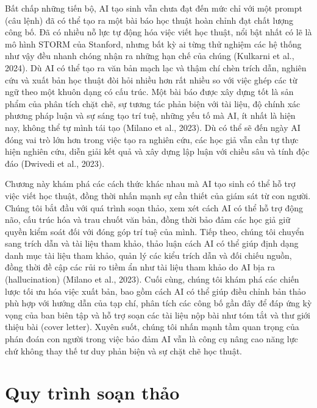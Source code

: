 Bất chấp những tiến bộ, AI tạo sinh vẫn chưa đạt đến mức chỉ với một prompt (câu lệnh) đã có thể tạo ra một bài báo học thuật hoàn chỉnh đạt chất lượng công bố. Đã có nhiều nỗ lực tự động hóa việc viết học thuật, nổi bật nhất có lẽ là mô hình STORM của Stanford, nhưng bất kỳ ai từng thử nghiệm các hệ thống như vậy đều nhanh chóng nhận ra những hạn chế của chúng (Kulkarni et al., 2024). Dù AI có thể tạo ra văn bản mạch lạc và thậm chí chèn trích dẫn, nghiên cứu và xuất bản học thuật đòi hỏi nhiều hơn rất nhiều so với việc ghép các từ ngữ theo một khuôn dạng có cấu trúc. Một bài báo được xây dựng tốt là sản phẩm của phân tích chặt chẽ, sự tương tác phản biện với tài liệu, độ chính xác phương pháp luận và sự sáng tạo trí tuệ, những yếu tố mà AI, ít nhất là hiện nay, không thể tự mình tái tạo (Milano et al., 2023). Dù có thể sẽ đến ngày AI đóng vai trò lớn hơn trong việc tạo ra nghiên cứu, các học giả vẫn cần tự thực hiện nghiên cứu, diễn giải kết quả và xây dựng lập luận với chiều sâu và tính độc đáo (Dwivedi et al., 2023).

Chương này khám phá các cách thức khác nhau mà AI tạo sinh có thể hỗ trợ việc viết học thuật, đồng thời nhấn mạnh sự cần thiết của giám sát từ con người. Chúng tôi bắt đầu với quá trình soạn thảo, xem xét cách AI có thể hỗ trợ động não, cấu trúc hóa và trau chuốt văn bản, đồng thời bảo đảm các học giả giữ quyền kiểm soát đối với đóng góp trí tuệ của mình. Tiếp theo, chúng tôi chuyển sang trích dẫn và tài liệu tham khảo, thảo luận cách AI có thể giúp định dạng danh mục tài liệu tham khảo, quản lý các kiểu trích dẫn và đối chiếu nguồn, đồng thời đề cập các rủi ro tiềm ẩn như tài liệu tham khảo do AI bịa ra (hallucination) (Milano et al., 2023). Cuối cùng, chúng tôi khám phá các chiến lược tối ưu hóa việc xuất bản, bao gồm cách AI có thể giúp điều chỉnh bản thảo phù hợp với hướng dẫn của tạp chí, phân tích các công bố gần đây để đáp ứng kỳ vọng của ban biên tập và hỗ trợ soạn các tài liệu nộp bài như tóm tắt và thư giới thiệu bài (cover letter). Xuyên suốt, chúng tôi nhấn mạnh tầm quan trọng của phán đoán con người trong việc bảo đảm AI vẫn là công cụ nâng cao năng lực chứ không thay thế tư duy phản biện và sự chặt chẽ học thuật.

\section{Quy trình soạn thảo}

